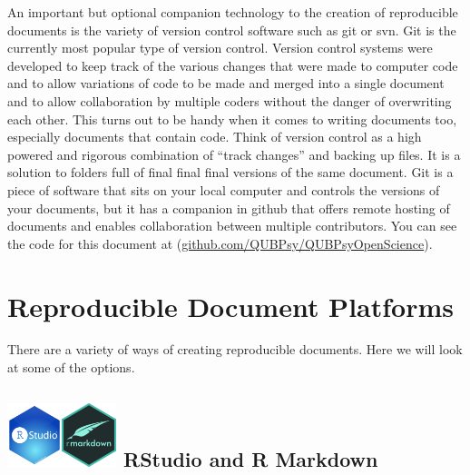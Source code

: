 \documentclass[
  letterpaper,
  DIV=11,
  numbers=noendperiod]{scrreprt}
\begin{document}
An important but optional companion technology to the creation of
reproducible documents is the variety of version control software such
as git or svn. Git is the currently most popular type of version
control. Version control systems were developed to keep track of the
various changes that were made to computer code and to allow variations
of code to be made and merged into a single document and to allow
collaboration by multiple coders without the danger of overwriting each
other. This turns out to be handy when it comes to writing documents
too, especially documents that contain code. Think of version control as
a high powered and rigorous combination of ``track changes'' and backing
up files. It is a solution to folders full of final final final versions
of the same document. Git is a piece of software that sits on your local
computer and controls the versions of your documents, but it has a
companion in github that offers remote hosting of documents and enables
collaboration between multiple contributors. You can see the code for
this document at
(\href{https://github.com/QUBPsy/QUBPsyOpenScience}{github.com/QUBPsy/QUBPsyOpenScience}).

\section{Reproducible Document
Platforms}\label{reproducible-document-platforms}

There are a variety of ways of creating reproducible documents. Here we
will look at some of the options.

\subsection[ RStudio and R
Markdown]{\texorpdfstring{\protect\includegraphics[width=0.625in,height=\textheight]{images/RStudio.png}\protect\includegraphics[width=0.625in,height=\textheight]{images/rmarkdownlogo.png}
RStudio and R
Markdown}{ RStudio and R Markdown}}\label{rstudio-and-r-markdown}
\end{document}
